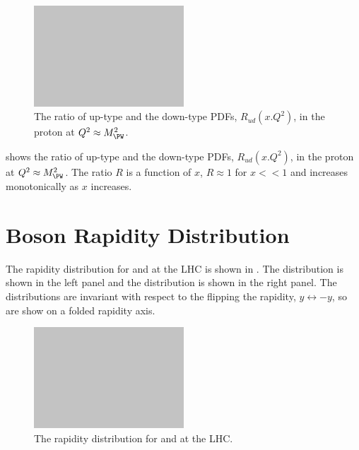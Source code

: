 \begin{figure}[htb]
  \centering
  \includegraphics[width=0.5\textwidth]{placeholder}
  \caption{The ratio of up-type and the down-type \acp{PDF}, $R_{ud}(x.Q^2)$,
  in the proton at $Q^2\approx M_{\PW}^2$.}
  \label{wbos:pdfrat}
\end{figure}

 shows the ratio of up-type and the down-type \acp{PDF},
$R_{ud}(x.Q^2)$, in the proton at $Q^2\approx M_{\PW}^2$. 
The ratio $R$ is a function of $x$, $R \approx 1$ for $x<<1$ and increases
monotonically as $x$ increases.  

\section{\PW Boson Rapidity Distribution}
\label{wbos:wrapsec}

The rapidity distribution for \PWp and \PWm at the \ac{LHC} is shown in
. 
The \PWm distribution is shown in the left panel and the \PWp distribution is
shown in the right panel. The distributions are invariant with respect to the
flipping the rapidity, $y\leftrightarrow-y$, so are show on a folded rapidity
axis.

\begin{figure}[htb]
  \centering
  \includegraphics[width=0.5\textwidth]{placeholder}
  \caption{The rapidity distribution for \PWp and \PWm at the LHC.}
  \label{wbos:wrapid}
\end{figure}

